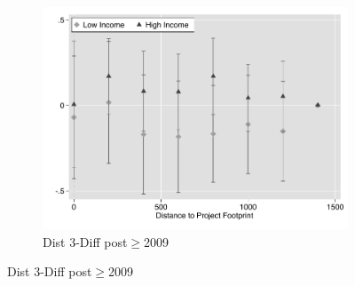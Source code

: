 \documentclass[12pt]{article}
\begin{document}
\begin{figure}
\begin{subfigure}[b]{0.48\textwidth}
        \end{subfigure}
 \begin{subfigure}[b]{0.48\textwidth}
                    \caption[Network2]%
            {{\footnotesize Dist 3-Diff post$\geq$2009}}    
            \label{fig:prefor}
            \centering
            \includegraphics[width=\textwidth,trim={0.3cm .3cm 0.1cm 0cm}, clip=true]{figures/price_dist_3d_no_ctrl_2009}
        \end{subfigure}
\end{figure}
\end{document}
